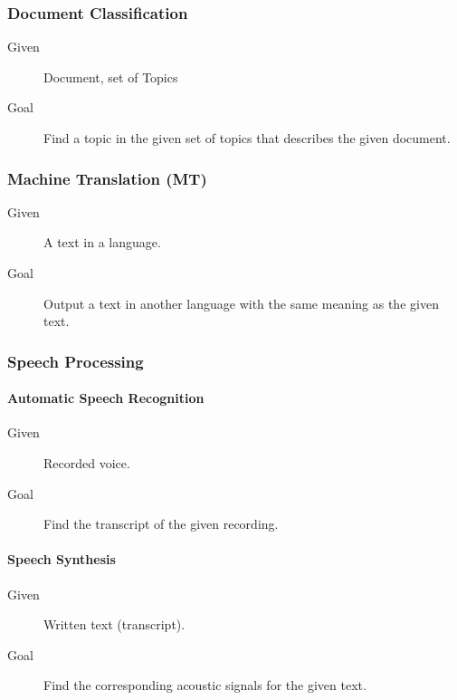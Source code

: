 \documentclass[a4paper, 11pt, accentcolor = tud3b]{tudreport}
\begin{document}
	            \subsubsection{Document Classification} %
	                \begin{description}
	                	\item[Given] Document, set of Topics
	                	\item[Goal] Find a topic in the given set of topics that describes the given document.
	                \end{description}
	            
	            \subsubsection{Machine Translation (MT)} %
		            \begin{description}
		            	\item[Given] A text in a language.
		            	\item[Goal] Output a text in another language with the same meaning as the given text.
		            \end{description}
	            
	            \subsubsection{Speech Processing} %
	            	\paragraph{Automatic Speech Recognition}
	            		\begin{description}
	            			\item[Given] Recorded voice.
	            			\item[Goal] Find the transcript of the given recording.
	            		\end{description}
	            	
	            	\paragraph{Speech Synthesis}
	            		\begin{description}
	            			\item[Given] Written text (transcript).
	            			\item[Goal] Find the corresponding acoustic signals for the given text.
	            		\end{description}
	            
\end{document}
